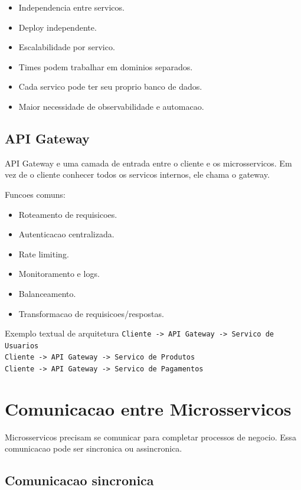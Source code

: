 \documentclass[12pt,a4paper]{article}
\begin{document}
\begin{itemize}
  \item Independencia entre servicos.
  \item Deploy independente.
  \item Escalabilidade por servico.
  \item Times podem trabalhar em dominios separados.
  \item Cada servico pode ter seu proprio banco de dados.
  \item Maior necessidade de observabilidade e automacao.
\end{itemize}

\subsection{API Gateway}

API Gateway e uma camada de entrada entre o cliente e os microsservicos. Em vez de o cliente conhecer todos os servicos internos, ele chama o gateway.

Funcoes comuns:

\begin{itemize}
  \item Roteamento de requisicoes.
  \item Autenticacao centralizada.
  \item Rate limiting.
  \item Monitoramento e logs.
  \item Balanceamento.
  \item Transformacao de requisicoes/respostas.
\end{itemize}

\begin{conceito}{Exemplo textual de arquitetura}
\texttt{Cliente -> API Gateway -> Servico de Usuarios}\\
\texttt{Cliente -> API Gateway -> Servico de Produtos}\\
\texttt{Cliente -> API Gateway -> Servico de Pagamentos}
\end{conceito}

\section{Comunicacao entre Microsservicos}

Microsservicos precisam se comunicar para completar processos de negocio. Essa comunicacao pode ser sincronica ou assincronica.

\subsection{Comunicacao sincronica}
\end{document}

